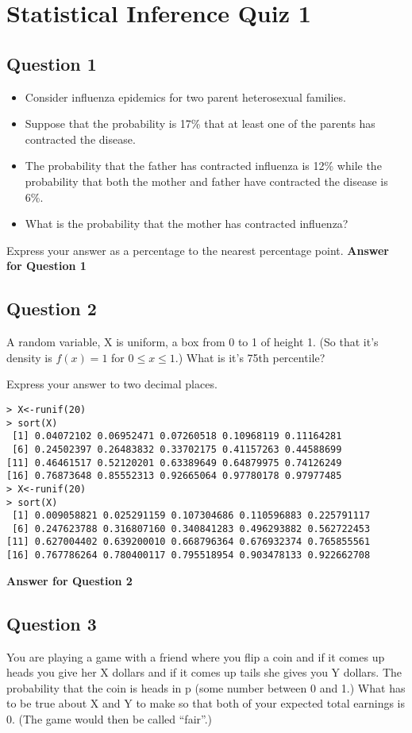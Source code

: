 \documentclass[]{article}
\begin{document}
\section{Statistical Inference Quiz 1}


\subsection{Question 1}

\begin{itemize}
\item Consider influenza epidemics for two parent heterosexual families. 
\item Suppose that the probability is 17\% that at least one of the parents has contracted the disease. 
\item The probability that the father has contracted influenza is 12\% while the probability that both the mother and father have contracted the disease is 6\%. 
\item What is the probability that the mother has contracted influenza?
\end{itemize}
Express your answer as a percentage to the nearest percentage point.
\textbf{Answer for Question 1}
\subsection{Question 2}
A random variable, X is uniform, a box from 0 to 1 of height 1. (So that it's density is $f(x)=1$ for $0\leq x\leq 1$.) 
What is it's 75th percentile?

Express your answer to two decimal places.
\begin{verbatim}
> X<-runif(20)
> sort(X)
 [1] 0.04072102 0.06952471 0.07260518 0.10968119 0.11164281
 [6] 0.24502397 0.26483832 0.33702175 0.41157263 0.44588699
[11] 0.46461517 0.52120201 0.63389649 0.64879975 0.74126249
[16] 0.76873648 0.85552313 0.92665064 0.97780178 0.97977485
> X<-runif(20)
> sort(X)
 [1] 0.009058821 0.025291159 0.107304686 0.110596883 0.225791117
 [6] 0.247623788 0.316807160 0.340841283 0.496293882 0.562722453
[11] 0.627004402 0.639200010 0.668796364 0.676932374 0.765855561
[16] 0.767786264 0.780400117 0.795518954 0.903478133 0.922662708
\end{verbatim}

\textbf{Answer for Question 2}
\subsection{Question 3}
You are playing a game with a friend where you flip a coin and if it comes up heads you give her X dollars and if it comes up tails she gives you Y dollars. 
The probability that the coin is heads in p (some number between 0 and 1.) 
What has to be true about X and Y to make so that both of your expected total earnings is 0. 
(The game would then be called “fair”.)
\end{document}
